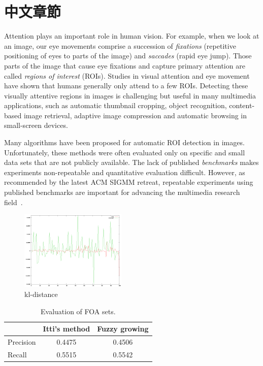 \chapter{中文章節}
\label{c:template}

Attention plays an important role in human vision. For example, when
we look at an image, our eye movements comprise a succession of {\em
fixations} (repetitive positioning of eyes to parts of the image)
and {\em saccades} (rapid eye jump). Those parts of the image that
cause eye fixations and capture primary attention are called {\em
regions of interest} (ROIs). Studies in visual attention and eye
movement have shown that humans generally only attend to a few ROIs.
Detecting these visually attentive regions in images is challenging
but useful in many multimedia applications, such as automatic
thumbnail cropping, object recognition, content-based image
retrieval, adaptive image compression and automatic browsing in
small-screen devices.

Many algorithms have been proposed for automatic ROI detection in
images. Unfortunately, these methods were often evaluated only on
specific and small data sets that are not publicly available. The
lack of published {\em benchmarks} makes experiments non-repeatable
and quantitative evaluation difficult. However, as recommended by
the latest ACM SIGMM retreat, repeatable experiments using published
benchmarks are important for advancing the multimedia research
field~\cite{Rowe:2005:ASR}.

\begin{figure}
\centering
\includegraphics[width=0.45\textwidth]{sample}
\caption{kl-distance}
\label{kl}
\end{figure}

\begin{table}[t]
\begin{center}
\begin{tabular}{lcc}

\hline
                    &  {\small Itti's method}     & {\small Fuzzy growing}    \\
\hline
{\small Precision}           &  0.4475    & 0.4506 \\
{\small Recall}              &  0.5515    & 0.5542 \\
\hline

\end{tabular}
\caption[Evaluation of FOA sets]{\small Evaluation of FOA sets. } \label{t:FOA}
\end{center}
\end{table}
